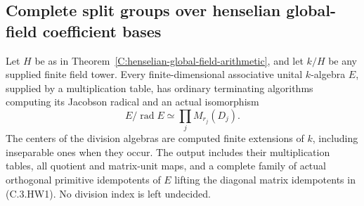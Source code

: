 \subsection{Complete split groups over henselian global-field coefficient bases}
\label{C:henselian-global-WG-subsection}

\begin{theorem}
\label{C:henselian-global-finite-algebra-algorithms}
Let $H$ be as in
Theorem~\ref{C:henselian-global-field-arithmetic},
and let $k/H$ be any supplied finite field tower.
Every finite-dimensional associative unital
$k$-algebra $E$, supplied by a multiplication
table, has ordinary terminating algorithms
computing its Jacobson radical and an actual
isomorphism
\[
 E/\operatorname{rad}E
       \simeq\prod_j M_{r_j}(D_j).                       \tag{C.3.HW1}
\]
The centers of the division algebras are
computed finite extensions of $k$, including
inseparable ones when they occur.
The output includes their multiplication
tables, all quotient and matrix-unit maps,
and a complete family of actual orthogonal
primitive idempotents of $E$ lifting the
diagonal matrix idempotents in (C.3.HW1).
No division index is left undecided.
\end{theorem}
